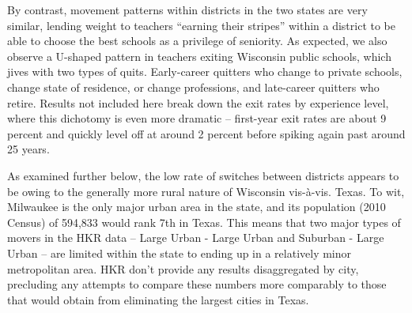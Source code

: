 \documentclass[12pt,]{article}
\begin{document}
By contrast, movement patterns within districts in the two states are
very similar, lending weight to teachers ``earning their stripes''
within a district to be able to choose the best schools as a privilege
of seniority. As expected, we also observe a U-shaped pattern in
teachers exiting Wisconsin public schools, which jives with two types of
quits. Early-career quitters who change to private schools, change state
of residence, or change professions, and late-career quitters who
retire. Results not included here break down the exit rates by
experience level, where this dichotomy is even more dramatic --
first-year exit rates are about 9 percent and quickly level off at
around 2 percent before spiking again past around 25 years.

As examined further below, the low rate of switches between districts
appears to be owing to the generally more rural nature of Wisconsin
vis-à-vis. Texas. To wit, Milwaukee is the only major urban area in the
state, and its population (2010 Census) of 594,833 would rank 7th in
Texas. This means that two major types of movers in the HKR data --
Large Urban - Large Urban and Suburban - Large Urban -- are limited
within the state to ending up in a relatively minor metropolitan area.
HKR don't provide any results disaggregated by city, precluding any
attempts to compare these numbers more comparably to those that would
obtain from eliminating the largest cities in Texas.
\end{document}
